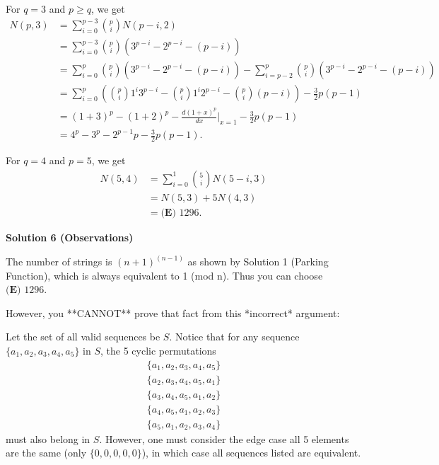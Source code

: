 \begin{enumerate}
 For $q = 3$ and $p \geq q$, we get
 \begin{align*} N \left( p , 3 \right) & = \sum_{i = 0}^{p - 3} \binom{p}{i} N \left( p - i, 2 \right) \\ & = \sum_{i = 0}^{p - 3} \binom{p}{i} \left( 3^{p - i} - 2^{p - i} - \left( p - i \right) \right) \\ & = \sum_{i = 0}^p \binom{p}{i} \left( 3^{p - i} - 2^{p - i} - \left( p - i \right) \right) - \sum_{i = p - 2}^p \binom{p}{i} \left( 3^{p - i} - 2^{p - i} - \left( p - i \right) \right) \\ & = \sum_{i = 0}^p \left( \binom{p}{i} 1^i 3^{p - i} - \binom{p}{i} 1^i 2^{p - i} - \binom{p}{i} \left( p - i \right) \right) - \frac{3}{2} p \left( p - 1 \right) \\ & = \left( 1 + 3 \right)^p - \left( 1 + 2 \right)^p - \frac{d \left( 1 + x \right)^p}{dx} \bigg|_{x = 1} - \frac{3}{2} p \left( p - 1 \right) \\ & = 4^p - 3^p - 2^{p-1} p - \frac{3}{2} p \left( p - 1 \right) . \end{align*}


 For $q = 4$ and $p = 5$, we get
 \begin{align*} N \left( 5 , 4 \right) & = \sum_{i = 0}^1 \binom{5}{i} N \left( 5 - i , 3 \right) \\ & = N \left( 5 , 3 \right) + 5 N \left( 4 , 3 \right) \\ & = \boxed{\textbf{(E) }1296}  . \end{align*}





\textbf{Solution 6 (Observations)}

The number of strings is $(n+1)^{(n-1)}$ as shown by Solution 1 (Parking Function), which is always equivalent to 1 (mod n). Thus you can choose $\boxed{\textbf{(E) }1296}$.

 However, you **CANNOT** prove that fact from this *incorrect* argument:

 Let the set of all valid sequences be $S$. Notice that for any sequence $\{a_1,a_2,a_3,a_4,a_5\}$ in $S$, the 5 cyclic permutations
 \begin{align*} \{a_1,a_2,a_3,a_4,a_5\}\\ \{a_2,a_3,a_4,a_5,a_1\}\\ \{a_3,a_4,a_5,a_1,a_2\}\\ \{a_4,a_5,a_1,a_2,a_3\}\\ \{a_5,a_1,a_2,a_3,a_4\} \end{align*}
must also belong in $S$. However, one must consider the edge case all 5 elements are the same (only $\{0,0,0,0,0\}$), in which case all sequences listed are equivalent.


\end{enumerate}
